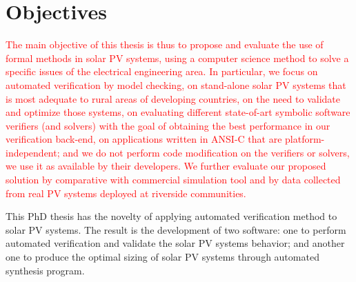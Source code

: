 \section{Objectives}

\textcolor{red}{The main objective of this thesis is thus to propose and evaluate the use of formal methods in solar PV systems, using a computer science method to solve a specific issues of the electrical engineering area. In particular, we focus on automated verification by model checking, on stand-alone solar PV systems that is most adequate to rural areas of developing countries, on the need to validate and optimize those systems, on evaluating different state-of-art symbolic software verifiers (and solvers) with the goal of obtaining the best performance in our verification back-end, on applications written in ANSI-C that are platform-independent; and we do not perform code modification on the verifiers or solvers, we use it as available by their developers. We further evaluate our proposed solution by comparative with commercial simulation tool and by data collected from real PV systems deployed at riverside communities.}

This PhD thesis has the novelty of applying automated verification method to solar PV systems. The result is the development of two software: one to perform automated verification and validate the solar PV systems behavior; and another one to produce the optimal sizing of solar PV systems through automated synthesis program.

